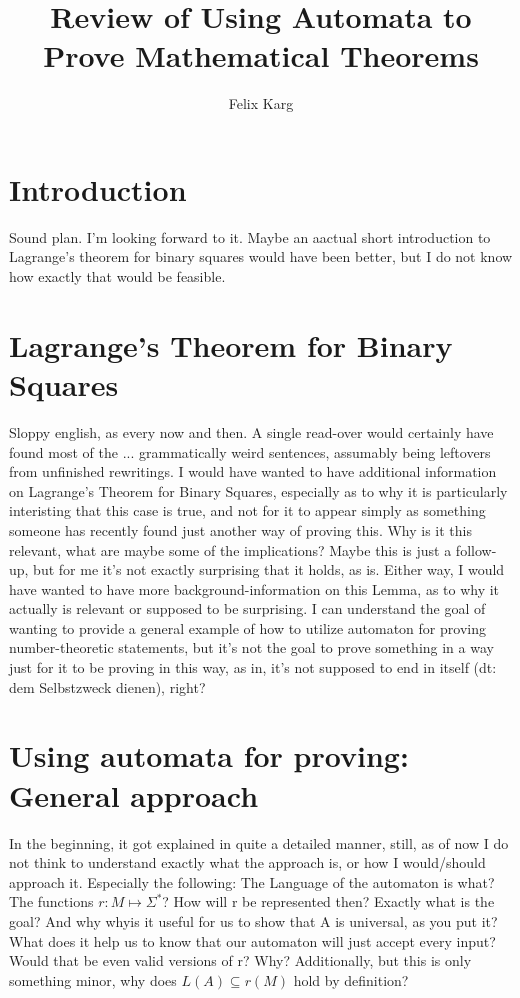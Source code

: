 \documentclass{scrartcl}
\title{Review of Using Automata to Prove Mathematical Theorems}
\author{Felix Karg}
\begin{document}
\maketitle


% 
% 

\section*{Introduction}
Sound plan. I'm looking forward to it. Maybe an aactual short introduction to
Lagrange's theorem for binary squares would have been better, but I do not know
how exactly that would be feasible.

\section*{Lagrange's Theorem for Binary Squares}
Sloppy english, as every now and then. A single read-over would certainly have
found most of the ... grammatically weird sentences, assumably being leftovers
from unfinished rewritings. I would have wanted to have additional information
on Lagrange's Theorem for Binary Squares, especially as to why it is
particularly interisting that this case is true, and not for it to appear
simply as something someone has recently found just another way of proving
this. Why is it this relevant, what are maybe some of the implications?
Maybe this is just a follow-up, but for me it's not exactly surprising that it
holds, as is. Either way, I would have wanted to have more
background-information on this Lemma, as to why it actually is relevant or
supposed to be surprising. I can understand the goal of wanting to provide a
general example of how to utilize automaton for proving number-theoretic
statements, but it's not the goal to prove something in a way just for it to be
proving in this way, as in, it's not supposed to end in itself (dt: dem
Selbstzweck dienen), right?

\section*{Using automata for proving: General approach}
In the beginning, it got explained in quite a detailed manner, still, as of now
I do not think to understand exactly what the approach is, or how I
would/should approach it. Especially the following: The Language of the
automaton is what? The functions $r: M \mapsto \Sigma^*$? How will r be
represented then? Exactly what is the goal? And why whyis it useful for us to
show that A is universal, as you put it? What does it help us to know that our
automaton will just accept every input? Would that be even valid versions of r?
Why? Additionally, but this is only something minor, why does $L(A) \subseteq
r(M)$ hold by definition?
\end{document}
